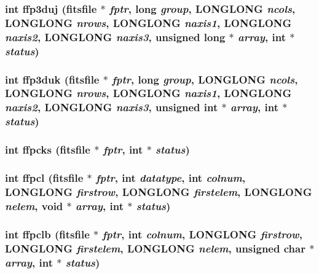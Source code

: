 \subsubsection{\setlength{\rightskip}{0pt plus 5cm}int ffp3duj (\bf{fitsfile} $\ast$ {\em fptr}, long {\em group}, \bf{LONGLONG} {\em ncols}, \bf{LONGLONG} {\em nrows}, \bf{LONGLONG} {\em naxis1}, \bf{LONGLONG} {\em naxis2}, \bf{LONGLONG} {\em naxis3}, unsigned long $\ast$ {\em array}, int $\ast$ {\em status})}\label{fitsio_8h_1e610ca12d1921d2b12d1f51184ec1fb}


\subsubsection{\setlength{\rightskip}{0pt plus 5cm}int ffp3duk (\bf{fitsfile} $\ast$ {\em fptr}, long {\em group}, \bf{LONGLONG} {\em ncols}, \bf{LONGLONG} {\em nrows}, \bf{LONGLONG} {\em naxis1}, \bf{LONGLONG} {\em naxis2}, \bf{LONGLONG} {\em naxis3}, unsigned int $\ast$ {\em array}, int $\ast$ {\em status})}\label{fitsio_8h_245d5b7ef5c4c394dbc0c7f3f55a5857}


\subsubsection{\setlength{\rightskip}{0pt plus 5cm}int ffpcks (\bf{fitsfile} $\ast$ {\em fptr}, int $\ast$ {\em status})}\label{fitsio_8h_1063ed09b8a73de4a574e6c4a49c1d72}


\subsubsection{\setlength{\rightskip}{0pt plus 5cm}int ffpcl (\bf{fitsfile} $\ast$ {\em fptr}, int {\em datatype}, int {\em colnum}, \bf{LONGLONG} {\em firstrow}, \bf{LONGLONG} {\em firstelem}, \bf{LONGLONG} {\em nelem}, void $\ast$ {\em array}, int $\ast$ {\em status})}\label{fitsio_8h_28b5f096ba5dc640cd642afdf31c7e01}


\subsubsection{\setlength{\rightskip}{0pt plus 5cm}int ffpclb (\bf{fitsfile} $\ast$ {\em fptr}, int {\em colnum}, \bf{LONGLONG} {\em firstrow}, \bf{LONGLONG} {\em firstelem}, \bf{LONGLONG} {\em nelem}, unsigned char $\ast$ {\em array}, int $\ast$ {\em status})}\label{fitsio_8h_292509f5a619292d087aaa3b8b40a621}


